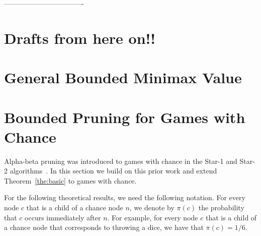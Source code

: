 ----------------------------------
\section{Drafts from here on!!}
\section{General Bounded Minimax Value}






\section{Bounded Pruning for Games with Chance}

Alpha-beta pruning was introduced to games with chance in the Star-1 and Star-2 algorithms~\cite{TODO}. In this section we build on this prior work and extend Theorem~\ref{the:basic} to games with chance. 

For the following theoretical results, we need the following notation. For every node $c$ that is a child of a chance node $n$, we denote by $\pi(c)$ the probability that $c$ occurs immediately after $n$. For example, for every node $c$ that is a child of a  chance node that corresponds to throwing a dice, we have that $\pi(c)=1/6$. 

